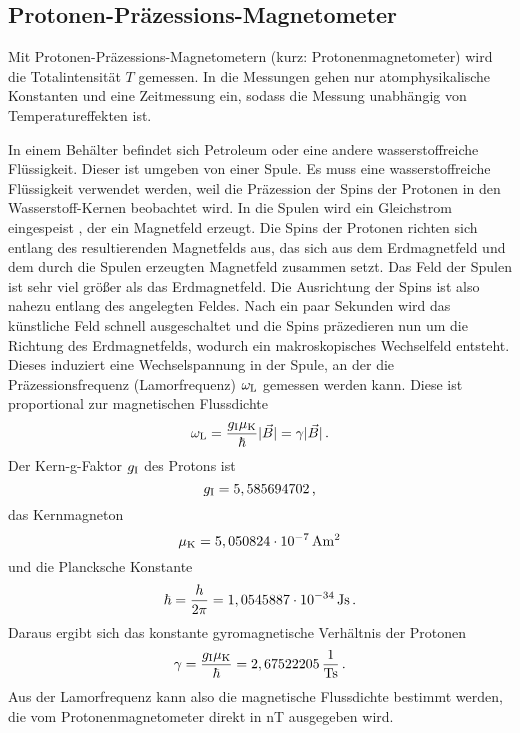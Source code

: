 \subsection{Protonen-Präzessions-Magnetometer}

Mit Protonen-Präzessions-Magnetometern (kurz: Protonenmagnetometer) wird die Totalintensität $T$ gemessen. In die Messungen gehen nur atomphysikalische Konstanten und eine Zeitmessung ein, sodass die Messung unabhängig von Temperatureffekten ist.

In einem Behälter befindet sich Petroleum oder eine andere wasserstoffreiche Flüssigkeit. Dieser ist umgeben von einer Spule. Es muss eine wasserstoffreiche Flüssigkeit verwendet werden, weil die Präzession der Spins der Protonen in den Wasserstoff-Kernen beobachtet wird. In die Spulen wird ein Gleichstrom eingespeist , der ein Magnetfeld erzeugt. Die Spins der Protonen richten sich entlang des resultierenden Magnetfelds aus, das sich aus dem Erdmagnetfeld und dem durch die Spulen erzeugten Magnetfeld zusammen setzt. Das Feld der Spulen ist sehr viel größer als das Erdmagnetfeld. Die Ausrichtung der Spins ist also nahezu entlang des angelegten Feldes. Nach ein paar Sekunden wird das künstliche Feld schnell ausgeschaltet und die Spins präzedieren nun um die Richtung des Erdmagnetfelds, wodurch ein makroskopisches Wechselfeld entsteht. Dieses induziert eine Wechselspannung in der Spule, an der die Präzessionsfrequenz (Lamorfrequenz) $\omega_{\mathrm{L}}$ gemessen werden kann. Diese ist proportional zur magnetischen Flussdichte
\begin{equation}
 \omega_{\mathrm{L}}=\frac{g_{\mathrm{I}}\mu_{\mathrm{K}}}{\hbar}|\vec{B}|=\gamma |\vec{B}| \text{\,.}
\end{equation}
Der Kern-g-Faktor $g_{\mathrm{I}}$ des Protons ist
\begin{equation}
 g_{\mathrm{I}}=5,585694702\text{\,,}
\end{equation}
das Kernmagneton
\begin{equation}
 \mu_{\mathrm{K}}=5,050824\cdot 10^{-7}\,\mathrm{Am^2}
\end{equation}
und die Plancksche Konstante
\begin{equation}
 \hbar=\frac{h}{2\pi}=1,0545887\cdot 10^{-34}\,\mathrm{Js} \text{\,.}
\end{equation}
Daraus ergibt sich das konstante gyromagnetische Verhältnis der Protonen
\begin{equation}
 \gamma=\frac{g_{\mathrm{I}}\mu_{\mathrm{K}}}{\hbar}=2,67522205\,\frac{\mathrm{1}}{\mathrm{Ts}} \text{\,.}
\end{equation}
Aus der Lamorfrequenz kann also die magnetische Flussdichte bestimmt werden, die vom Protonenmagnetometer direkt in nT ausgegeben wird.

